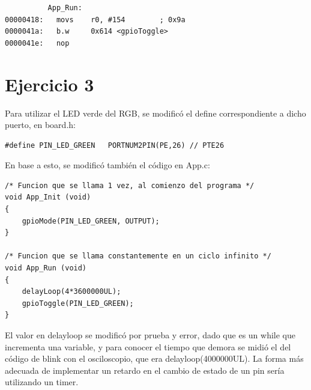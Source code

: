 \documentclass{article}
\begin{document}
\begin{lstlisting}
          App_Run:
00000418:   movs    r0, #154        ; 0x9a
0000041a:   b.w     0x614 <gpioToggle>
0000041e:   nop     
\end{lstlisting}

\newpage

\section*{Ejercicio 3}

Para utilizar el LED verde del RGB, se modificó el define correspondiente a dicho puerto, en board.h:

\begin{lstlisting}
#define PIN_LED_GREEN   PORTNUM2PIN(PE,26) // PTE26
\end{lstlisting}

En base a esto, se modificó también el código en App.c:

\begin{lstlisting}
/* Funcion que se llama 1 vez, al comienzo del programa */
void App_Init (void)
{
    gpioMode(PIN_LED_GREEN, OUTPUT);
}

/* Funcion que se llama constantemente en un ciclo infinito */
void App_Run (void)
{
    delayLoop(4*3600000UL);
    gpioToggle(PIN_LED_GREEN);
}
\end{lstlisting}

El valor en delayloop se modificó por prueba y error, dado que es un while que incrementa una variable, y para conocer el tiempo que demora se midió el del código de blink con el osciloscopio, que era delayloop(4000000UL). La forma más adecuada de implementar un retardo en el cambio de estado de un pin sería utilizando un timer.
\end{document}
